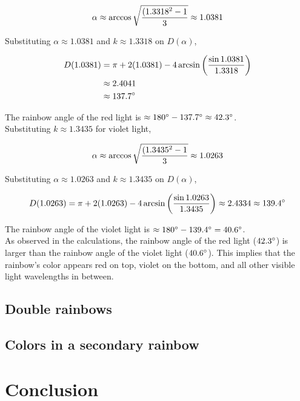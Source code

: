 \documentclass[a4paper,12pt]{article}
\begin{document}
\begin{equation}\notag
\alpha \approx \arccos \sqrt{\dfrac{(1.3318^2 -1}{3}}
\approx 1.0381
\end{equation}

Substituting $\alpha \approx 1.0381$ and $k \approx 1.3318$ on $D(\alpha)$,

\begin{align*}
D(1.0381) &= \pi + 2(1.0381) - 4\arcsin \left( \frac{\sin 1.0381}{1.3318} \right)\\
&\approx 2.4041\\
&\approx 137.7 \degree
\end{align*}

The rainbow angle of the red light is $\approx 180 \degree - 137.7 \degree \approx 42.3 \degree$.\\

Substituting $k \approx 1.3435$ for violet light,

\begin{equation}\notag
\alpha \approx \arccos \sqrt{\dfrac{(1.3435^2 -1}{3}}
\approx 1.0263
\end{equation}

Substituting $\alpha \approx 1.0263$ and $k \approx 1.3435$ on $D(\alpha)$,

\begin{align*}
D(1.0263) = \pi + 2(1.0263) - 4\arcsin \left( \frac{\sin 1.0263}{1.3435} \right)
\approx 2.4334
\approx 139.4 \degree
\end{align*}

The rainbow angle of the violet light is $\approx 180 \degree - 139.4 \degree = 40.6 \degree$.\\

As observed in the calculations, the rainbow angle of the red light ($42.3 \degree$) is larger than the rainbow angle of the violet light ($40.6 \degree$). This implies that the rainbow’s color appears red on top, violet on the bottom, and all other visible light wavelengths in between.

\subsection{Double rainbows}

\subsection{Colors in a secondary rainbow}

\section{Conclusion}
\end{document}
